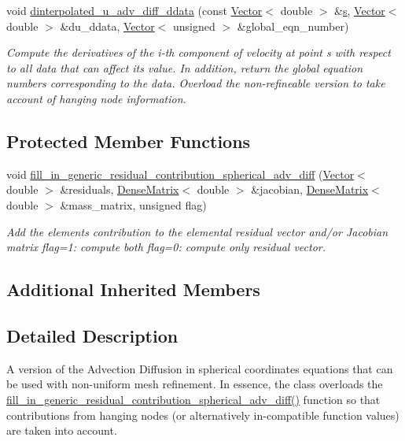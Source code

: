 \begin{DoxyCompactItemize}
void \hyperlink{classoomph_1_1RefineableSphericalAdvectionDiffusionEquations_ad334452c86e729a53dcbd234a1420680}{dinterpolated\+\_\+u\+\_\+adv\+\_\+diff\+\_\+ddata} (const \hyperlink{classoomph_1_1Vector}{Vector}$<$ double $>$ \&\hyperlink{cfortran_8h_ab7123126e4885ef647dd9c6e3807a21c}{s}, \hyperlink{classoomph_1_1Vector}{Vector}$<$ double $>$ \&du\+\_\+ddata, \hyperlink{classoomph_1_1Vector}{Vector}$<$ unsigned $>$ \&global\+\_\+eqn\+\_\+number)
\begin{DoxyCompactList}\small\item\em Compute the derivatives of the i-\/th component of velocity at point s with respect to all data that can affect its value. In addition, return the global equation numbers corresponding to the data. Overload the non-\/refineable version to take account of hanging node information. \end{DoxyCompactList}\end{DoxyCompactItemize}
\subsection*{Protected Member Functions}
\begin{DoxyCompactItemize}
\item 
void \hyperlink{classoomph_1_1RefineableSphericalAdvectionDiffusionEquations_a08a48e0e7e544ec61f4adde6c5e41211}{fill\+\_\+in\+\_\+generic\+\_\+residual\+\_\+contribution\+\_\+spherical\+\_\+adv\+\_\+diff} (\hyperlink{classoomph_1_1Vector}{Vector}$<$ double $>$ \&residuals, \hyperlink{classoomph_1_1DenseMatrix}{Dense\+Matrix}$<$ double $>$ \&jacobian, \hyperlink{classoomph_1_1DenseMatrix}{Dense\+Matrix}$<$ double $>$ \&mass\+\_\+matrix, unsigned flag)
\begin{DoxyCompactList}\small\item\em Add the element\textquotesingle{}s contribution to the elemental residual vector and/or Jacobian matrix flag=1\+: compute both flag=0\+: compute only residual vector. \end{DoxyCompactList}\end{DoxyCompactItemize}
\subsection*{Additional Inherited Members}


\subsection{Detailed Description}
A version of the Advection Diffusion in spherical coordinates equations that can be used with non-\/uniform mesh refinement. In essence, the class overloads the \hyperlink{classoomph_1_1RefineableSphericalAdvectionDiffusionEquations_a08a48e0e7e544ec61f4adde6c5e41211}{fill\+\_\+in\+\_\+generic\+\_\+residual\+\_\+contribution\+\_\+spherical\+\_\+adv\+\_\+diff()} function so that contributions from hanging nodes (or alternatively in-\/compatible function values) are taken into account. 

